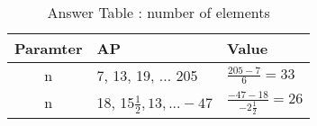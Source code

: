 \begin{table}[ht] \label{table2}
\centering
\setlength{\extrarowheight}{10pt}
\begin{tabular}{|c|l|l|} 
 \hline
  \textbf{Paramter} & \textbf{AP} & \textbf{Value} \\ 
 \hline
n & 7, 13, 19, ... 205 & $\frac{205 - 7}{6} = 33$\\
 \hline
n & 18, 15$\frac{1}{2}, 13, ... -47$ & $\frac{-47 - 18 }{-2\frac{1}{2}} = 26$\\
 \hline
\end{tabular}
 \vspace{4mm}
 \caption{Answer Table : number of elements}
 \label{table1}
\end{table}
